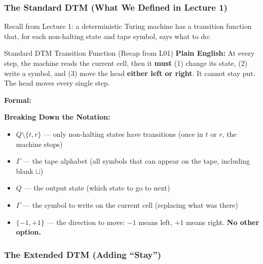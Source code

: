 \subsubsection{The Standard DTM (What We Defined in Lecture 1)}

Recall from Lecture 1: a deterministic Turing machine has a transition function that, for each non-halting state and tape symbol, says what to do:

\begin{definitionbox}{Standard DTM Transition Function (Recap from L01)}
\textbf{Plain English:} At every step, the machine reads the current cell, then it \textbf{must} (1) change its state, (2) write a symbol, and (3) move the head \textbf{either left or right}. It cannot stay put. The head moves every single step.

\textbf{Formal:}

\textbf{Breaking Down the Notation:}
\begin{itemize}[nosep]
\item $Q \setminus \{t, r\}$ --- only non-halting states have transitions (once in $t$ or $r$, the machine stops)
\item $\Gamma$ --- the tape alphabet (all symbols that can appear on the tape, including blank $\sqcup$)
\item $Q$ --- the output state (which state to go to next)
\item $\Gamma$ --- the symbol to write on the current cell (replacing what was there)
\item $\{-1, +1\}$ --- the direction to move: $-1$ means left, $+1$ means right. \textbf{No other option.}
\end{itemize}
\end{definitionbox}

\subsubsection{The Extended DTM (Adding ``Stay'')}

